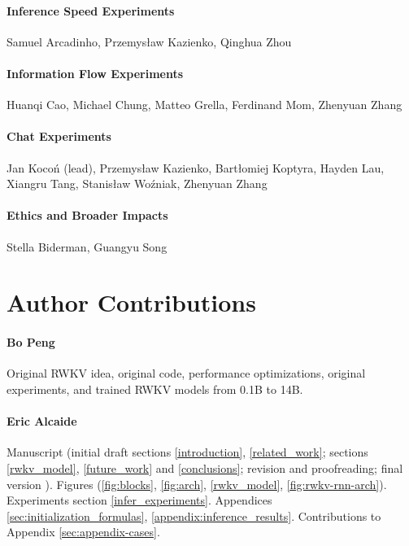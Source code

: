 \documentclass[11pt]{article}
\begin{document}
\paragraph{Inference Speed Experiments} Samuel Arcadinho, Przemys\l{}aw Kazienko, Qinghua Zhou

\paragraph{Information Flow Experiments} Huanqi Cao, Michael Chung, Matteo Grella, Ferdinand Mom, Zhenyuan Zhang

\paragraph{Chat Experiments} Jan Kocoń (lead), Przemys\l{}aw Kazienko, Bart\l{}omiej Koptyra, Hayden Lau, Xiangru Tang, Stanis\l{}aw Wo\'{z}niak, Zhenyuan Zhang

\paragraph{Ethics and Broader Impacts} Stella Biderman, Guangyu Song

\clearpage
\section{Author Contributions}

\paragraph{Bo Peng} Original RWKV idea, original code, performance optimizations, original experiments, and trained RWKV models from 0.1B to 14B.

\paragraph{Eric Alcaide} Manuscript (initial draft sections \ref{introduction}, \ref{related_work}; sections \ref{rwkv_model}, \ref{future_work} and \ref{conclusions}; revision and proofreading; final version ). Figures (\ref{fig:blocks},  \ref{fig:arch}, \ref{rwkv_model}, \ref{fig:rwkv-rnn-arch}). Experiments section \ref{infer_experiments}. Appendices \ref{sec:initialization_formulas}, \ref{appendix:inference_results}. Contributions to Appendix \ref{sec:appendix-cases}.

\end{document}
